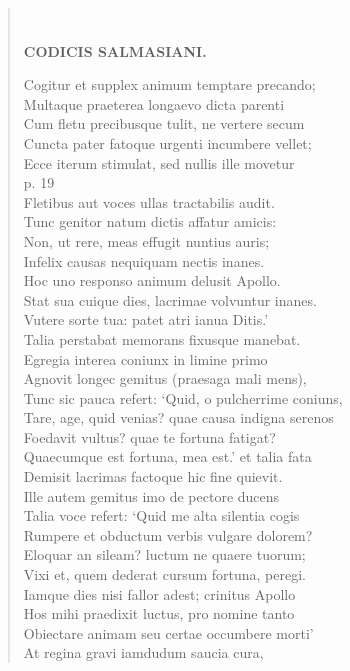\documentclass[11pt, a4paper]{report}
\begin{document}
\begin{verse}
        ﻿\pagebreak 
    \begin{center} \textbf{CODICIS SALMASIANI.} \end{center} \marginpar{[53]} Cogitur et supplex animum temptare precando; \\ Multaque praeterea longaevo dicta parenti \\ Cum fletu precibusque tulit, ne vertere secum \\ Cuncta pater fatoque urgenti incumbere vellet; \\ Ecce iterum stimulat, sed nullis ille movetur \\ p. 19 \\ Fletibus aut voces ullas tractabilis audit. \\ Tunc genitor natum dictis affatur amicis: \\ Non, ut rere, meas effugit nuntius auris; \\ Infelix causas nequiquam nectis inanes. \\ Hoc uno responso animum delusit Apollo. \\ Stat sua cuique dies, lacrimae volvuntur inanes. \\ Vutere sorte tua: patet atri ianua Ditis.’ \\ Talia perstabat memorans fixusque manebat. \\ Egregia interea coniunx in limine primo \\ Agnovit longec gemitus (praesaga mali mens), \\ Tunc sic pauca refert: ‘Quid, o pulcherrime coniuns, \\ Tare, age, quid venias? quae causa indigna serenos \\ Foedavit vultus? quae te fortuna fatigat? \\ Quaecumque est fortuna, mea est.’ et talia fata \\ Demisit lacrimas factoque hic fine quievit. \\ Ille autem gemitus imo de pectore ducens \\ Talia voce refert: ‘Quid me alta silentia cogis \\ Rumpere et obductum verbis vulgare dolorem? \\ Eloquar an sileam? luctum ne quaere tuorum; \\ Vixi et, quem dederat cursum fortuna, peregi. \\ Iamque dies nisi fallor adest; crinitus Apollo \\ Hos mihi praedixit luctus, pro nomine tanto \\ Obiectare animam seu certae occumbere morti’ \\ At regina gravi iamdudum saucia cura, \\ 

\end{verse}
\end{document}
